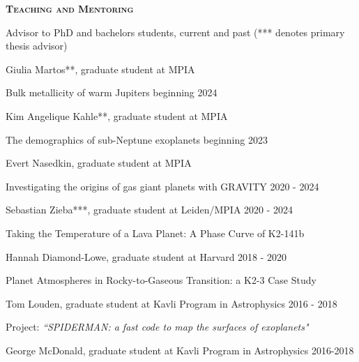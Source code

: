 \documentclass[12pt,letterpaper]{article}
\begin{document}
\vspace{7mm}
\textbf{\textsc{Teaching and Mentoring}} 
\begin{compactitem}[]
\item Advisor to PhD and bachelors students, current and past (*** denotes primary thesis advisor)
	\begin{compactitem}
        \item Giulia Martos**, graduate student at MPIA \hfill  
		\begin{sloppypar}
	         Bulk metallicity of warm Jupiters \hfill beginning 2024
		\end{sloppypar}
        \item Kim Angelique Kahle**, graduate student at MPIA \hfill  
		\begin{sloppypar}
	         The demographics of sub-Neptune exoplanets \hfill beginning 2023
		\end{sloppypar}
        \item Evert Nasedkin, graduate student at MPIA \hfill 
		\begin{sloppypar}
	         Investigating the origins of gas giant planets with GRAVITY \hfill 2020 - 2024	
		\end{sloppypar}
        \item Sebastian Zieba***, graduate student at Leiden/MPIA \hfill 2020 - 2024
		\begin{sloppypar}
		Taking the Temperature of a Lava Planet: A Phase Curve of K2-141b
		\end{sloppypar}
        \item Hannah Diamond-Lowe, graduate student at Harvard \hfill 2018 - 2020
		\begin{sloppypar}
		Planet Atmospheres in Rocky-to-Gaseous Transition: a K2-3 Case Study
		\end{sloppypar}
	\item Tom Louden, graduate student at Kavli Program in Astrophysics \hfill 2016 - 2018
		\begin{sloppypar}
		Project: \textit{``SPIDERMAN: a fast code to map the surfaces of exoplanets"}
		\end{sloppypar}
	\item George McDonald, graduate student at Kavli Program in Astrophysics \hfill 2016-2018

\end{compactitem}
\end{compactitem}
\end{document}
